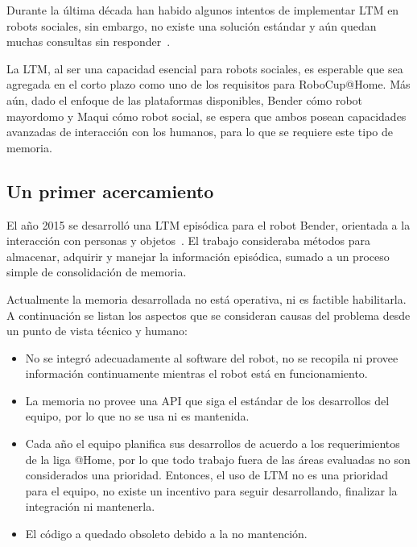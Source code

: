 Durante la última década han habido algunos intentos de implementar LTM en robots sociales, sin embargo, no existe una solución estándar y aún quedan muchas consultas sin responder~\cite{ltm_in_robocup}.

La LTM, al ser una capacidad esencial para robots sociales, es esperable que sea agregada en el corto plazo como uno de los requisitos para RoboCup@Home. Más aún, dado el enfoque de las plataformas disponibles, Bender cómo robot mayordomo y Maqui cómo robot social, se espera que ambos posean capacidades avanzadas de interacción con los humanos, para lo que se requiere este tipo de memoria.


\subsection{Un primer acercamiento}\label{sec:primer_acercamiento}

El año 2015 se desarrolló una LTM episódica para el robot Bender, orientada a la interacción con personas y objetos~\cite{Sanchez:2015}. El trabajo consideraba métodos para almacenar, adquirir y manejar la información episódica, sumado a un proceso simple de consolidación de memoria.

Actualmente la memoria desarrollada no está operativa, ni es factible habilitarla. A continuación se listan los aspectos que se consideran causas del problema desde un punto de vista técnico y humano:
\begin{itemize}
	\item No se integró adecuadamente al software del robot, no se recopila ni provee información continuamente mientras el robot está en funcionamiento.
	\item La memoria no provee una API que siga el estándar de los desarrollos del equipo, por lo que no se usa ni es mantenida.
	\item Cada año el equipo planifica sus desarrollos de acuerdo a los requerimientos de la liga @Home, por lo que todo trabajo fuera de las áreas evaluadas no son considerados una prioridad. Entonces, el uso de LTM no es una prioridad para el equipo, no existe un incentivo para seguir desarrollando, finalizar la integración ni mantenerla. 
	\item El código a quedado obsoleto debido a la no mantención.
\end{itemize}

